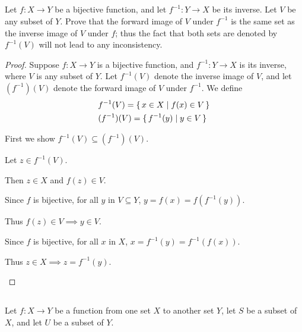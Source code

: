 \documentclass[../../main.tex]{subfiles}
\begin{document}

\subsection{}
\begin{q}
    Let $f \colon X \to Y$ be a bijective function, and let $f^{-1} \colon Y \to X$ be its inverse. Let $V$ be any subset of $Y$. Prove that the forward image of $V$ under $f^{-1}$ is the same set as the inverse image of $V$ under $f$; thus the fact that both sets are denoted by $f^{-1}(V)$ will not lead to any inconsistency.
\end{q}
    
\begin{proof}
    Suppose $f \colon X \to Y$ is a bijective function, and $f^{-1} \colon Y \to X$ is its inverse, where $V$ is any subset of $Y$.
    Let $f^{-1}(V)$ denote the inverse image of $V$, and let $(f^{-1})(V)$ denote the forward image of $V$ under $f^{-1}$.
    We define
    \begin{equation*}
    \begin{aligned}
        & f^{-1}(V) = \{\,x \in X\mid f(x) \in V\,\} \\
        & (f^{-1})(V) = \{\,f^{-1}(y)\mid y \in V\,\}
    \end{aligned}
    \end{equation*}

    \begin{lxl}
            \item First we show $f^{-1}(V) \subseteq (f^{-1})(V)$.
            \item Let $z \in f^{-1}(V)$. 
            \item Then $z \in X$ and $f(z) \in V$. 
            \item Since $f$ is bijective, for all $y$ in $V \subseteq Y$, $y = f(x) = f(f^{-1}(y))$.
            \item Thus $f(z) \in V \implies y \in V$. 
            \item Since $f$ is bijective, for all $x$ in $X$, $x = f^{-1}(y) = f^{-1}(f(x))$.
            \item Thus $z \in X \implies z = f^{-1}(y)$. 
    \end{lxl}
\end{proof}

\subsection{}
\begin{q}
    Let $f \colon X \to Y$ be a function from one set $X$ to another set $Y$, let $S$ be a subset of $X$, and let $U$ be a subset of $Y$.
\end{q}
\end{document}
